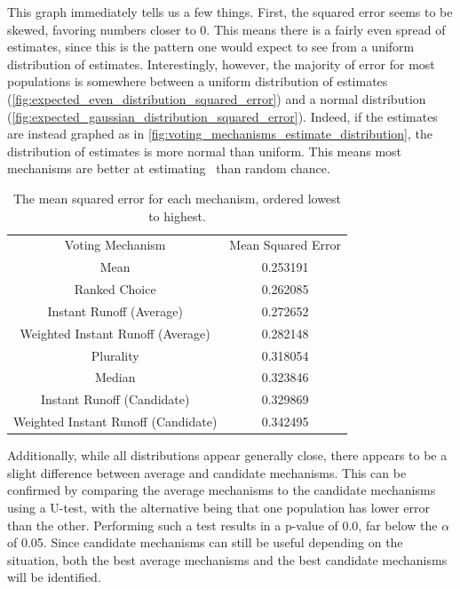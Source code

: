 This graph immediately tells us a few things.
First, the squared error seems to be skewed, favoring numbers closer to 0.
This means there is a fairly even spread of estimates, since this is the
pattern one would expect to see from a uniform distribution of estimates.
Interestingly, however, the majority of error for most populations is
somewhere between a uniform distribution of estimates
(\autoref{fig:expected_even_distribution_squared_error}) and a normal
distribution (\autoref{fig:expected_gaussian_distribution_squared_error}).
Indeed, if the estimates are instead graphed as in
\autoref{fig:voting_mechanisms_estimate_distribution}, the distribution of estimates
is more normal than uniform.
This means most mechanisms are better at estimating \truth\ than random chance.

\begin{table}[htbp]
    \renewcommand{\arraystretch}{1.0}

    \caption{The mean squared error for each mechanism, ordered lowest to highest.}
    \label{tab:voting-mechanism-mean-error}

    \centering
    \begin{tabular}{|c|c|}
        \hline
        Voting Mechanism                    & Mean Squared Error \\
        \hhline{|=|=|}
        Mean                                & 0.253191           \\
        \hline
        Ranked Choice                       & 0.262085           \\
        \hline
        Instant Runoff (Average)            & 0.272652           \\
        \hline
        Weighted Instant Runoff (Average)   & 0.282148           \\
        \hline
        Plurality                           & 0.318054           \\
        \hline
        Median                              & 0.323846           \\
        \hline
        Instant Runoff (Candidate)          & 0.329869           \\
        \hline
        Weighted Instant Runoff (Candidate) & 0.342495           \\
        \hline
    \end{tabular}
\end{table}

Additionally, while all distributions appear generally close, there appears to be a
slight difference between average and candidate mechanisms.
This can be confirmed by comparing the average mechanisms to the candidate mechanisms
using a U-test, with the alternative being that one population has lower error than the
other.
Performing such a test results in a p-value of 0.0, far below the $\alpha$ of 0.05.
Since candidate mechanisms can still be useful depending on the situation, both the
best average mechanisms and the best candidate mechanisms will be identified.

